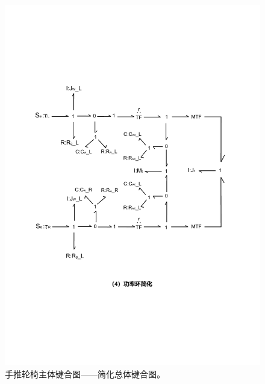 	\begin{figure}[!h]
		\centering
		\includegraphics[width=1.1\textwidth,angle=90]{fig/3_5_bond.pdf}
		\caption{手推轮椅主体键合图——简化总体键合图。}\label{fig:part1_bond}
	\end{figure}

